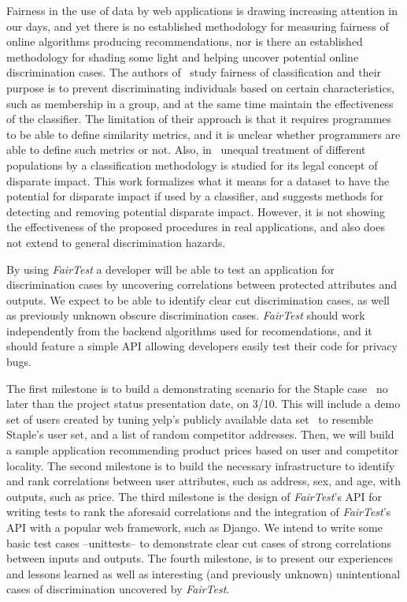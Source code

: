 \documentclass{article}
\newcommand{\thetool}{{\it FairTest}\xspace}
\newcommand{\heading}[1]{\noindent{\bf{#1}}}
\begin{document}
\heading{Related Work.}
Fairness in the use of data by web applications is drawing increasing
attention in our days, and yet there is no established methodology for
measuring fairness of online algorithms producing recommendations, nor is
there an established methodology for shading some light and helping
uncover potential online discrimination cases. The authors of~\cite{Fairness}
study fairness of classification and their purpose is to prevent
discriminating individuals based on certain characteristics, such as
membership in a group, and at the same time maintain the effectiveness of
the classifier. The limitation of their approach is that it requires
programmes to be able to define similarity metrics, and it is unclear
whether programmers are able to define such metrics or not. Also,
in~\cite{DisparateImpact} unequal treatment of different populations
by a classification methodology is studied for its legal concept of
disparate impact. This work formalizes what it means for a dataset to
have the potential for disparate impact if used by a classifier, and
suggests methods for detecting and removing potential disparate impact.
However, it is not showing the effectiveness of the proposed procedures
in real applications, and also does not extend to general discrimination
hazards.

\heading{Expected Conclusions.}
By using \thetool a developer will be able to test an application for
discrimination cases by uncovering correlations between protected attributes
and outputs. We expect to be able to identify clear cut discrimination cases,
as well as previously unknown obscure discrimination cases. \thetool should
work independently from the backend algorithms used for recomendations,
and it should feature a
simple API allowing developers easily test their code for privacy bugs.

\heading{Research Plan.}
The first milestone is to build a demonstrating scenario for the Staple
case~\cite{Staples} no later than the project status presentation date, on 3/10.
This will include a demo set of users created by tuning yelp's publicly
available data set~\cite{Yelp} to resemble Staple's user set, and a list of
random competitor addresses. Then, we will build a sample application
recommending product prices based on user and competitor locality.
The second milestone is to build the necessary infrastructure to identify and
rank correlations between user attributes, such as address, sex, and age, with
outputs, such as price. The third milestone is the design of \thetool's API
for writing tests to rank the aforesaid correlations and the integration of
\thetool's API with a popular web framework, such as Django. We intend to write
some basic test cases --unittests-- to demonstrate clear cut cases of strong
correlations between inputs and outputs. The fourth milestone, is to present our
experiences and lessons learned as well as interesting (and previously unknown)
unintentional cases of discrimination uncovered by \thetool.

{
  \scriptsize
  \setlength\itemsep{0pt}
  \footnotesize
  
  
}
\end{document}
